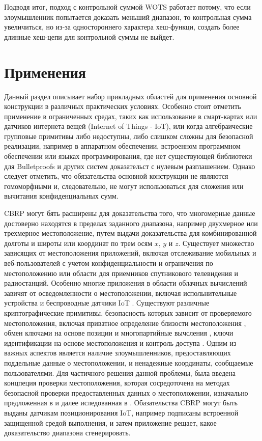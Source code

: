 Подводя итог, подход с контрольной суммой WOTS работает потому, что если злоумышленник попытается доказать меньший диапазон, то контрольная сумма увеличиться, но из-за одностороннего характера хеш-функци, создать более длинные хеш-цепи для контрольной суммы не выйдет.

\section{Применения} %
Данный раздел описывает набор прикладных областей для применения основной конструкции в различных практических условиях.
Особенно стоит отметить применение в ограниченных средах, таких как использование в смарт-картах или датчиков интернета вещей (Internet of Things - IoT), или когда алгебраические групповые примитивы либо недоступны, либо слишком сложны для безопасной реализации, например в аппаратном обеспечении, встроенном программном обеспечении или языках программирования, где нет существующей библиотеки для Bulletproofs и других систем доказательст с нулевым разглашением.
Однако следует отметить, что обязательства основной конструкции не являются гомоморфными и, следовательно, не могут использоваться для сложения или вычитания конфиденциальных сумм.

CBRP могут бять расширены для доказательства того, что многомерные данные достоверно находятся в пределах заданного диапазона, например двухмерное или трехмерное местоположение, путем выдачи доказательства для комбинированной долготы и широты или координат по трем осям $x$, $y$ и $z$.
Существует множество зависящих от местоположения приложений, включая отслеживание мобильных и веб-пользователей с учетом конфиденциальности и ограничения по местоположению или области для приемников спутникового телевидения и радиостанций.
Особенно многие приложения в области облачных вычислений завичят от осведомленности о местоположении, включая испольнительные устройства и беспроводные датчики IoT \cite{YANG2018799}. Существуют различные криптографические примитивы, безопасность которых зависит от проверяемого местоположения, включая приватное определение близости местоположения \cite{Narayanan2011LocationPV}, обмен ключами на основе позиции и многопартийные вычсления \cite{10.1007/978-3-642-03356-8_23}, ключи идентификации на основе местоположения \cite{Chalkias2010SecureCP} и контроль доступа \cite{10.1007/978-3-642-22497-3_16}.
Одним из важных аспектов является наличие злоумышленников, предоставляющих поддельные данные о местоположении, и ненадежные координаты, сообщаемые пользователями.
Для частичного решения данной проблемы, была введена концпеция проверки местоположения, которая сосредоточена на методах безопасной проверки предоставленных данных о местоположении, изначально предложенная в \cite{10.1007/3-540-48285-7_30} и далее иследованная в \cite{e76f5acad5d74705bd527e4b44d1aa9a, 10.1007/978-3-642-03356-8_23, 10.1145/941311.941313, 1542879, 4012649, YANG2018799, 1618808}.
Обазательства CBRP могут быть выданы датчикам позиционирования IoT, например подписаны встроенной защищенной средой выполнения, и затем приложение рещает, какое доказательство диапазона сгенерировать.

